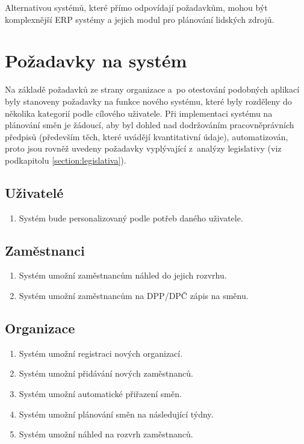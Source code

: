 \documentclass[twoside]{ctuthesis}
\begin{document}
Alternativou systémů, které přímo odpovídají požadavkům, mohou být komplexnější ERP systémy a jejich modul pro plánování lidských zdrojů.

\section{Požadavky na systém}
Na základě požadavků ze strany organizace a~po otestování podobných aplikací byly stanoveny požadavky na funkce nového systému, které byly rozděleny do několika kategorií podle cílového uživatele. Při implementaci systému na plánování směn je žádoucí, aby byl dohled nad dodržováním pracovněprávních předpisů (především těch, které uvádějí kvantitativní údaje), automatizován, proto jsou rovněž uvedeny požadavky vyplývající z~analýzy legislativy (viz podkapitolu \ref{section:legislativa}).

\subsection{Uživatelé}
\begin{enumerate}[label=\textbf{U\arabic*.}]
		\item Systém bude personalizovaný podle potřeb daného uživatele.
\end{enumerate}

\subsection{Zaměstnanci}
\begin{enumerate}[label=\textbf{Z\arabic*.}]
		\item Systém umožní zaměstnancům náhled do jejich rozvrhu.
		\item Systém umožní zaměstnancům na DPP/DPČ zápis na směnu.
\end{enumerate}

\subsection{Organizace}
\begin{enumerate}[label=\textbf{O\arabic*.}]
	\item Systém umožní registraci nových organizací.
	\item Systém umožní přidávání nových zaměstnanců.
	\item Systém umožní automatické přiřazení směn.
	\item Systém umožní plánování směn na následující týdny.
	\item Systém umožní náhled na rozvrh zaměstnanců.
\end{enumerate}
\end{document}
